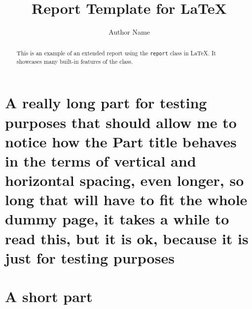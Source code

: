 \documentclass{report}
\title{Report Template for \LaTeX}
\author{Author Name}
\begin{document}
\maketitle

\begin{abstract}
  This is an example of an extended report using the \texttt{report} class in LaTeX. It showcases many built-in features of the class.
\end{abstract}

\tableofcontents

\begin{abstract}
  \lipsum[1-2]
\end{abstract}

\layout%

\part{A really long part for testing purposes that should allow me to notice how the Part title behaves in the terms of vertical and horizontal spacing, even longer, so long that will have to fit the whole dummy page, it takes a while to read this, but it is ok, because it is just for testing purposes}
\part{A short part}


\end{document}
